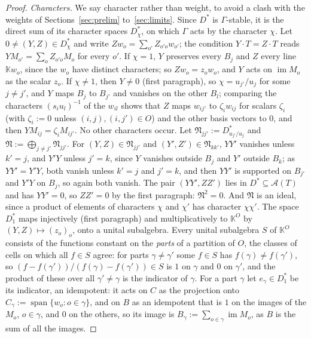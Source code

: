 \documentclass[11pt]{article}
\theoremstyle{definition}
\theoremstyle{remark}
\begin{document}
\begin{proof}
\emph{Characters.} We say character rather than weight, to avoid a clash with the weights of Sections~\ref{sec:prelim} to~\ref{sec:limits}. Since $D^*$ is $\Gamma$-stable, it is the direct sum of its character spaces $D^*_\chi$, on which $\Gamma$ acts by the character $\chi$. Let $0\ne(Y,Z)\in D^*_\chi$ and write $Zw_o=\sum_{o'}Z_{o'o}w_{o'}$; the condition $Y\cdot T=Z\cdot T$ reads $YM_{o'}=\sum_oZ_{o'o}M_o$ for every $o'$. If $\chi=1$, $Y$ preserves every $B_j$ and $Z$ every line $\mathbb Kw_o$, since the $w_o$ have distinct characters; so $Zw_o=z_ow_o$, and $Y$ acts on $\operatorname{im}M_o$ as the scalar $z_o$. If $\chi\ne1$, then $Y\ne0$ (first paragraph), so $\chi=u_{j'}/u_j$ for some $j\ne j'$, and $Y$ maps $B_j$ to $B_{j'}$ and vanishes on the other $B_l$; comparing the characters $(s_iu_l)^{-1}$ of the $w_{il}$ shows that $Z$ maps $w_{ij'}$ to $\zeta_iw_{ij}$ for scalars $\zeta_i$ (with $\zeta_i:=0$ unless $(i,j),(i,j')\in O$) and the other basis vectors to $0$, and then $YM_{ij}=\zeta_iM_{ij'}$. No other characters occur. Let $\mathfrak N_{jj'}:=D^*_{u_{j'}/u_j}$ and $\mathfrak N:=\bigoplus_{j\ne j'}\mathfrak N_{jj'}$. For $(Y,Z)\in\mathfrak N_{jj'}$ and $(Y',Z')\in\mathfrak N_{kk'}$, $YY'$ vanishes unless $k'=j$, and $Y'Y$ unless $j'=k$, since $Y$ vanishes outside $B_j$ and $Y'$ outside $B_k$; as $YY'=Y'Y$, both vanish unless $k'=j$ and $j'=k$, and then $YY'$ is supported on $B_{j'}$ and $Y'Y$ on $B_j$, so again both vanish. The pair $(YY',ZZ')$ lies in $D^*\subseteq\mathcal A(T)$ and has $YY'=0$, so $ZZ'=0$ by the first paragraph: $\mathfrak N^2=0$. And $\mathfrak N$ is an ideal, since a product of elements of characters $\chi$ and $\chi'$ has character $\chi\chi'$. The space $D^*_1$ maps injectively (first paragraph) and multiplicatively to $\mathbb K^O$ by $(Y,Z)\mapsto(z_o)_o$, onto a unital subalgebra. Every unital subalgebra $S$ of $\mathbb K^O$ consists of the functions constant on the \emph{parts} of a partition of $O$, the classes of cells on which all $f\in S$ agree: for parts $\gamma\ne\gamma'$ some $f\in S$ has $f(\gamma)\ne f(\gamma')$, so $(f-f(\gamma'))/(f(\gamma)-f(\gamma'))\in S$ is $1$ on $\gamma$ and $0$ on $\gamma'$, and the product of these over all $\gamma'\ne\gamma$ is the indicator of $\gamma$. For a part $\gamma$ let $e_\gamma\in D^*_1$ be its indicator, an idempotent: it acts on $C$ as the projection onto $C_\gamma:=\operatorname{span}\{w_o:o\in\gamma\}$, and on $B$ as an idempotent that is $1$ on the images of the $M_o$, $o\in\gamma$, and $0$ on the others, so its image is $B_\gamma:=\sum_{o\in\gamma}\operatorname{im}M_o$, as $B$ is the sum of all the images.


\end{proof}
\end{document}
